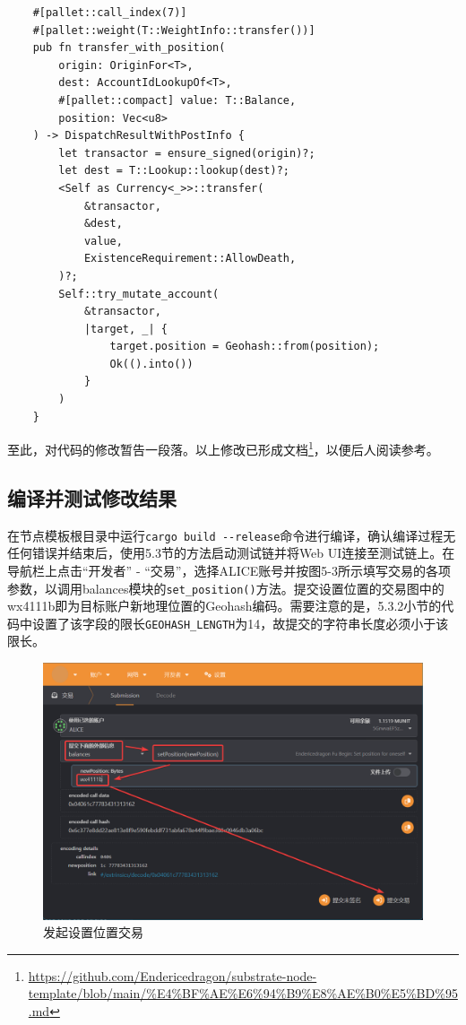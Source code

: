 \begin{lstlisting}
    #[pallet::call_index(7)]
    #[pallet::weight(T::WeightInfo::transfer())]
    pub fn transfer_with_position(
        origin: OriginFor<T>,
        dest: AccountIdLookupOf<T>,
        #[pallet::compact] value: T::Balance,
        position: Vec<u8>
    ) -> DispatchResultWithPostInfo {
        let transactor = ensure_signed(origin)?;
        let dest = T::Lookup::lookup(dest)?;
        <Self as Currency<_>>::transfer(
            &transactor,
            &dest,
            value,
            ExistenceRequirement::AllowDeath,
        )?;
        Self::try_mutate_account(
            &transactor,
            |target, _| {
                target.position = Geohash::from(position);
                Ok(().into())
            }
        )
    }
\end{lstlisting}

至此，对代码的修改暂告一段落。以上修改已形成文档\footnote{\url{https://github.com/Endericedragon/substrate-node-template/blob/main/\%E4\%BF\%AE\%E6\%94\%B9\%E8\%AE\%B0\%E5\%BD\%95.md}}，以便后人阅读参考。

\subsection{编译并测试修改结果}

在节点模板根目录中运行\verb|cargo build --release|命令进行编译，确认编译过程无任何错误并结束后，使用5.3节的方法启动测试链并将Web UI连接至测试链上。在导航栏上点击“开发者” - “交易”，选择ALICE账号并按图5-3所示填写交易的各项参数，以调用balances模块的\verb|set_position()|方法。提交设置位置的交易图中的wx4111b即为目标账户新地理位置的Geohash编码。需要注意的是，5.3.2小节的代码中设置了该字段的限长\verb|GEOHASH_LENGTH|为14，故提交的字符串长度必须小于该限长。

\begin{figure}[htbp]
    \centering
    \includegraphics[width=\textwidth]{images/setPos.png}
    \caption{发起设置位置交易}\label{发起设置位置交易} %
\end{figure}

